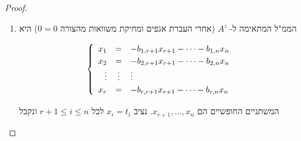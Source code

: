 \documentclass[12pt]{report}
\theoremstyle{plain}
\theoremstyle{definition}
\DeclareMathOperator{\rank}{rank}
\newcommand{\0}{\mathbf{0}}
\DeclareMathOperator{\Col}{Col}
\begin{document}
\begin{teacher}
\begin{proof}
\begin{enumerate}[label=\alph*.]
לגבי העמודות, ברור כי
$v_i=e_i$
לכל
$1\leq i\leq r$.
ברור גם ש-
$\Set{e_1,...,e_r}$
פורשת את שאר העמודות ולכן את
$\Col(A')$.
ידוע שזו קבוצה בת"ל, ולכן מדובר בבסיס. אז קיבלנו
$\dim(\Col(A'))=r$,
ולכן
$\dim(\Col(A))=\rank(A)$.

\item 
הממ"ל המתאימה ל-
$A'$
(אחרי העברת אגפים ומחיקת משוואות מהצורה 
$0=0$)
היא

$$
\begin{cases}
\begin{array}{r c l}
x_1 & = & -b_{1,r+1}x_{r+1}-\cdots-b_{1,n}x_n \\
x_2 & = & -b_{2,r+1}x_{r+1}-\cdots-b_{2,n}x_n \\
\vdots & \vdots & \vdots \\
x_r & = & -b_{r,r+1}x_{r+1}-\cdots-b_{r,n}x_n
\end{array}
\end{cases}
$$

המשתניים החופשיים הם 
$x_{r+1},...,x_n$.
נציב
$x_i=t_i$
לכל 
$r+1\leq i\leq n$
ונקבל


\end{enumerate}
\end{proof}
\end{teacher}
\end{document}
